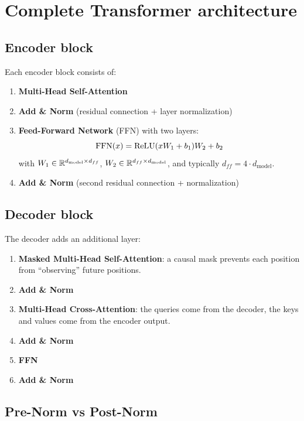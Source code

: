 \section{Complete Transformer architecture}
\label{sec:transformer-architecture}

\subsection{Encoder block}
\label{sec:encoder-block}

Each encoder block consists of:
\begin{enumerate}
    \item \textbf{Multi-Head Self-Attention}
    \item \textbf{Add \& Norm} (residual connection + layer normalization)
    \item \textbf{Feed-Forward Network} (FFN) with two layers:
    \begin{equation}
    \text{FFN}(x) = \mathrm{ReLU}(xW_1 + b_1)W_2 + b_2
    \end{equation}
    with $W_1 \in \mathbb{R}^{d_{\text{model}} \times d_{ff}}$, $W_2 \in \mathbb{R}^{d_{ff} \times d_{\text{model}}}$, and typically $d_{ff} = 4 \cdot d_{\text{model}}$.
    \item \textbf{Add \& Norm} (second residual connection + normalization)
\end{enumerate}

\subsection{Decoder block}
\label{sec:decoder-block}

The decoder adds an additional layer:
\begin{enumerate}
    \item \textbf{Masked Multi-Head Self-Attention}: a causal mask prevents each position from ``observing'' future positions.
    \item \textbf{Add \& Norm}
    \item \textbf{Multi-Head Cross-Attention}: the queries come from the decoder, the keys and values come from the encoder output.
    \item \textbf{Add \& Norm}
    \item \textbf{FFN}
    \item \textbf{Add \& Norm}
\end{enumerate}

\subsection{Pre-Norm vs Post-Norm}
\label{sec:pre-post-norm}

